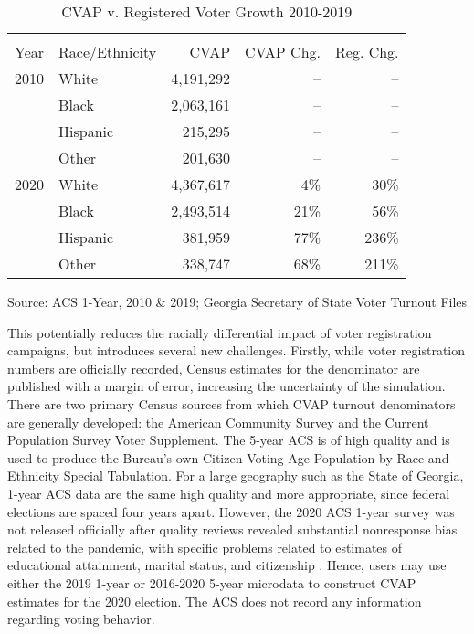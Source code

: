 \begin{table}[ht]
\centering
\begin{threeparttable}
\caption{CVAP v. Registered Voter Growth 2010-2019}  
\label{tab:cvap-chg-to}
\begin{tabular}{llrrr}
  \hline \\ \vspace{0.5em} 
 Year&   Race/Ethnicity & CVAP & CVAP Chg.& Reg. Chg.\\ 
   \hline
2010 & White &4,191,292 &  --&--\\ 
   & Black & 2,063,161 & -- &--\\ 
    &Hispanic & 215,295 & -- &--\\ 
    &Other & 201,630  & -- &--\\ 
  2020 & White &4,367,617 & 4\% & 30\%\\ 
    &Black & 2,493,514 & 21\% &    56\% \\ 
    &Hispanic & 381,959 & 77\%  &   236\% \\ 
    &Other &338,747 & 68\% &   211\% \\ 
   \hline
\end{tabular}
{\footnotesize Source: ACS 1-Year, 2010 \& 2019; Georgia Secretary of State Voter Turnout Files}
\end{threeparttable}
\end{table}



This potentially reduces the racially differential impact of voter registration campaigns, but introduces several new challenges. Firstly, while voter registration numbers are officially recorded, Census estimates for the denominator are published with a margin of error, increasing the uncertainty of the simulation. There are two primary Census sources from which CVAP turnout denominators are generally developed: the American Community Survey and the Current Population Survey Voter Supplement. The 5-year ACS is of high quality and is used to produce the Bureau's own Citizen Voting Age Population by Race and Ethnicity Special Tabulation. For a large geography such as the State of Georgia, 1-year ACS data are the same high quality and more appropriate, since federal elections are spaced four years apart. However, the 2020 ACS 1-year survey was not released officially after quality reviews revealed substantial nonresponse bias related to the pandemic, with specific problems related to estimates of educational attainment, marital status, and citizenship \citep{shin_assessment_2021}. Hence, users may use either the 2019 1-year or 2016-2020 5-year microdata to construct CVAP estimates for the 2020 election. The ACS does not record any information regarding voting behavior. 

